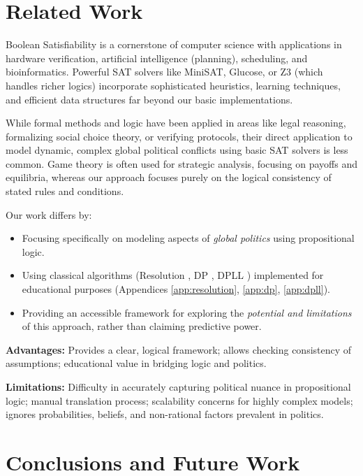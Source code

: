 \documentclass[11pt, a4paper]{article}
\begin{document}
\section{Related Work} \label{sec:relatedwork}

Boolean Satisfiability is a cornerstone of computer science with applications in hardware verification, artificial intelligence (planning), scheduling, and bioinformatics. Powerful SAT solvers like MiniSAT, Glucose, or Z3 (which handles richer logics) incorporate sophisticated heuristics, learning techniques, and efficient data structures far beyond our basic implementations.

While formal methods and logic have been applied in areas like legal reasoning, formalizing social choice theory, or verifying protocols, their direct application to model dynamic, complex global political conflicts using basic SAT solvers is less common. Game theory is often used for strategic analysis, focusing on payoffs and equilibria, whereas our approach focuses purely on the logical consistency of stated rules and conditions.

Our work differs by:
\begin{itemize}
    \item Focusing specifically on modeling aspects of \textit{global politics} using propositional logic.
    \item Using classical algorithms (Resolution \cite{Robinson1965}, DP \cite{DavisPutnam1960}, DPLL \cite{DPLL1962}) implemented for educational purposes (Appendices \ref{app:resolution}, \ref{app:dp}, \ref{app:dpll}).
    \item Providing an accessible framework for exploring the \textit{potential and limitations} of this approach, rather than claiming predictive power.
\end{itemize}

\textbf{Advantages:} Provides a clear, logical framework; allows checking consistency of assumptions; educational value in bridging logic and politics.

\textbf{Limitations:} Difficulty in accurately capturing political nuance in propositional logic; manual translation process; scalability concerns for highly complex models; ignores probabilities, beliefs, and non-rational factors prevalent in politics.


\section{Conclusions and Future Work} \label{sec:conclusions}
\end{document}
